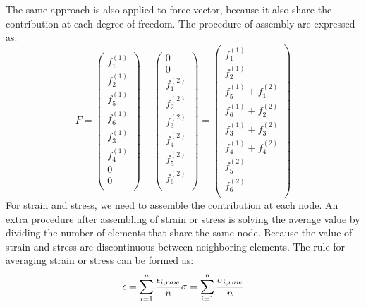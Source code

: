 The same approach is also applied to force vector, because it also share the contribution at each degree of freedom. The procedure of assembly are expressed as:
\begin{equation}
F =  \begin{pmatrix}
f_1^{\left(1\right)} \\
f_2^{\left(1\right)} \\
f_5^{\left(1\right)} \\ 
f_6^{\left(1\right)} \\ 
f_3^{\left(1\right)} \\
f_4^{\left(1\right)} \\
0 \\ 
0 \\ 
\end{pmatrix} +  \begin{pmatrix}
0 \\ 
0 \\ 
f_1^{\left(2\right)} \\
f_2^{\left(2\right)} \\
f_3^{\left(2\right)} \\ 
f_4^{\left(2\right)} \\ 
f_5^{\left(2\right)} \\
f_6^{\left(2\right)} \\
\end{pmatrix} = \begin{pmatrix}
f_1^{\left(1\right)} \\
f_2^{\left(1\right)} \\
f_5^{\left(1\right)}+ f_1^{\left(2\right)} \\ 
f_6^{\left(1\right)}+ f_2^{\left(2\right)} \\ 
f_3^{\left(1\right)}+ f_3^{\left(2\right)}\\
f_4^{\left(1\right)}+ f_4^{\left(2\right)} \\
f_5^{\left(2\right)} \\ 
f_6^{\left(2\right)}  \\ 
\end{pmatrix} 
\end{equation}
For strain and stress, we need to assemble the contribution at each node. An extra procedure after assembling of strain or stress is solving the average value by dividing the number of elements that share the same node. Because the value of strain and stress are discontinuous between neighboring elements. The rule for averaging strain or stress can be formed as:
\begin{equation}
\epsilon = \displaystyle\sum_{i=1}^{n} \frac{\epsilon_{i,raw}}{n}
\\
\sigma = \displaystyle\sum_{i=1}^{n} \frac{\sigma_{i,raw}}{n}
\end{equation} 



